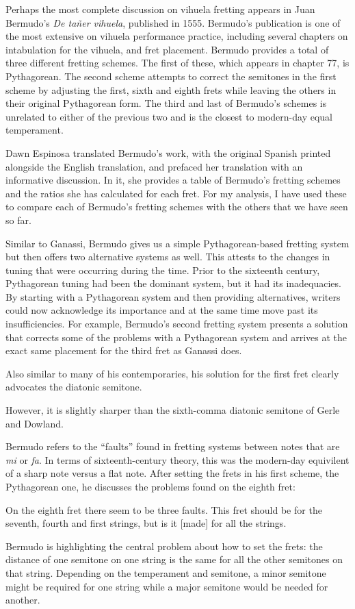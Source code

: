 Perhaps the most complete discussion on vihuela fretting appears in Juan Bermudo's
\textit{De ta\~{n}er vihuela}, published in 1555.  Bermudo's publication is one of the
most extensive on vihuela performance practice, including several chapters on
intabulation for the vihuela, and fret placement.  Bermudo provides a total of three
different fretting schemes.  The first of these, which appears in chapter 77, is
Pythagorean.  The second scheme attempts to correct the semitones in the first scheme
by adjusting the first, sixth and eighth frets while leaving the others in their
original Pythagorean form.  The third and last of Bermudo's schemes is unrelated to
either of the previous two and is the closest to modern-day equal temperament.

Dawn Espinosa translated Bermudo's work, with the original Spanish printed alongside
the English translation, and prefaced her translation with an informative discussion.
In it, she provides a table of Bermudo's fretting schemes and the ratios she has
calculated for each fret. For my analysis, I have used these to compare each of
Bermudo's fretting schemes with the others that we have seen so far.

Similar to Ganassi, Bermudo gives us a simple Pythagorean-based fretting system but
then offers two alternative systems as well. This attests to the changes in
tuning that were occurring during the time.  Prior to the sixteenth century, Pythagorean tuning
had been the dominant system, but it had its inadequacies.  By starting with a
Pythagorean system and then providing alternatives, writers could now acknowledge its
importance and at the same time move past its insufficiencies.  For example, Bermudo's second
fretting system presents a solution that corrects some of the problems with
a Pythagorean system and arrives at the exact same placement for the third fret as
Ganassi does.

Also similar to many of his contemporaries, his solution for the first fret clearly
advocates the diatonic semitone.

However, it is slightly sharper than the sixth-comma diatonic semitone of Gerle and
Dowland.

Bermudo refers to the ``faults'' found in fretting systems between notes that are
\textit{mi} or \textit{fa}.  In terms of sixteenth-century theory, this was the
modern-day equivilent of a sharp note versus a flat note.  After setting the frets in
his first scheme, the Pythagorean one, he discusses the problems found on the eighth
fret:
\begin{blocks}
On the eighth fret there seem to be three faults.  This fret should be  for the
seventh, fourth and first strings, but is it [made]  for all the strings.
\autocite[95]{DE:1}
\end{blocks}
Bermudo is highlighting the central problem about how to set the frets: the distance of one
semitone on one string is the same for all the other semitones on that string.  Depending
on the temperament and semitone, a minor semitone might be required for one string while
a major semitone would be needed for another.

